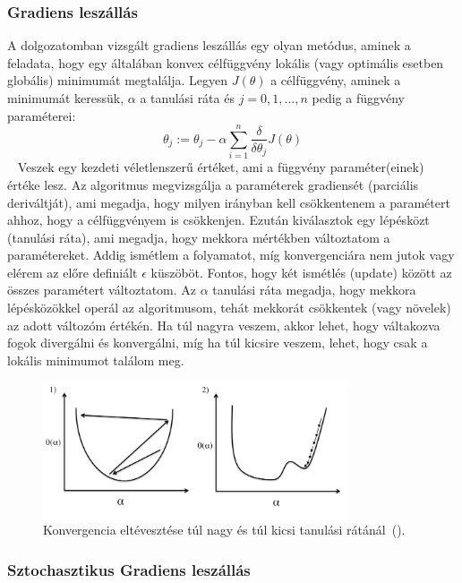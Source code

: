 \documentclass[a4paper,12pt]{article}
\begin{document}
\subsubsection{Gradiens leszállás}

A dolgozatomban vizsgált gradiens leszállás egy olyan metódus, aminek a feladata, hogy egy általában konvex célfüggvény lokális (vagy optimális esetben globális) minimumát megtalálja. Legyen $J(\theta)$ a célfüggvény, aminek a minimumát keressük, $\alpha$ a tanulási ráta és $j=0, 1, ..., n$ pedig a függvény paraméterei:
\[\theta_j:=\theta_j-\alpha\sum\limits_{i=1}^n\frac{\delta}{\delta\theta_j}J(\theta)\]~\cite{andrewml}
Veszek egy kezdeti véletlenszerű értéket, ami a függvény paraméter(einek) értéke lesz. Az algoritmus megvizsgálja a paraméterek gradiensét (parciális deriváltját), ami megadja, hogy milyen irányban kell csökkentenem a paramétert ahhoz, hogy a célfüggvényem is csökkenjen. Ezután kiválasztok egy lépésközt (tanulási ráta), ami megadja, hogy mekkora mértékben változtatom a paramétereket. Addig ismétlem a folyamatot, míg konvergenciára nem jutok vagy elérem az előre definiált $\epsilon$ küszöböt. Fontos, hogy két ismétlés (update) között az összes paramétert változtatom. \newline
Az $\alpha$ tanulási ráta megadja, hogy mekkora lépésközökkel operál az algoritmusom, tehát mekkorát csökkentek (vagy növelek) az adott változóm értékén. Ha túl nagyra veszem, akkor lehet, hogy váltakozva fogok divergálni és konvergálni, míg ha túl kicsire veszem, lehet, hogy csak a lokális minimumot találom meg.

\begin{figure}[ht!]
\centering
\includegraphics[width=90mm]{img/alfa.png}
\caption{Konvergencia eltévesztése túl nagy és túl kicsi tanulási rátánál~(\cite{learningrate}). \label{alfa}}
\end{figure}

\subsubsection{Sztochasztikus Gradiens leszállás}
\end{document}
